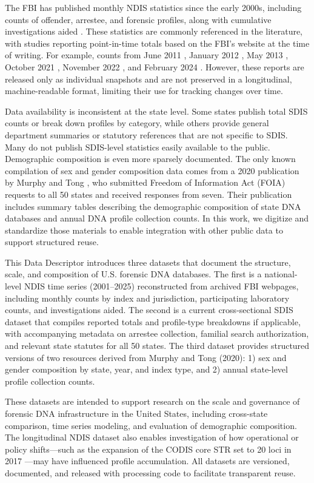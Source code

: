 \documentclass{article}
\begin{document}
The FBI has published monthly NDIS statistics since the early 2000s, including counts of offender, arrestee, and forensic profiles, along with cumulative investigations aided \cite{Unknown2022-qe}. These statistics are commonly referenced in the literature, with studies reporting point-in-time totals based on the FBI's website at the time of writing. For example, counts from June 2011 \cite{Ge2012-if}, January 2012 \cite{Ge2012-ve}, May 2013 \cite{Ge2014-rl}, October 2021 \cite{Wickenheiser2022-tb}, November 2022 \cite{Link2023-dm}, and February 2024 \cite{Greenwald2024-sg}. However, these reports are released only as individual snapshots and are not preserved in a longitudinal, machine-readable format, limiting their use for tracking changes over time.

Data availability is inconsistent at the state level. Some states publish total SDIS counts or break down profiles by category, while others provide general department summaries or statutory references that are not specific to SDIS. Many do not publish SDIS-level statistics easily available to the public. Demographic composition is even more sparsely documented. The only known compilation of sex and gender composition data comes from a 2020 publication by Murphy and Tong \cite{Murphy2020-pc}, who submitted Freedom of Information Act (FOIA) requests to all 50 states and received responses from seven. Their publication includes summary tables describing the demographic composition of state DNA databases and annual DNA profile collection counts. In this work, we digitize and standardize those materials to enable integration with other public data to support structured reuse.

This Data Descriptor introduces three datasets that document the structure, scale, and composition of U.S. forensic DNA databases. The first is a national-level NDIS time series (2001--2025) reconstructed from archived FBI webpages, including monthly counts by index and jurisdiction, participating laboratory counts, and investigations aided. The second is a current cross-sectional SDIS dataset that compiles reported totals and profile-type breakdowns if applicable, with accompanying metadata on arrestee collection, familial search authorization, and relevant state statutes for all 50 states. The third dataset provides structured versions of two resources derived from Murphy and Tong (2020): 1) sex and gender composition by state, year, and index type, and 2) annual state-level profile collection counts.

These datasets are intended to support research on the scale and governance of forensic DNA infrastructure in the United States, including cross-state comparison, time series modeling, and evaluation of demographic composition. The longitudinal NDIS dataset also enables investigation of how operational or policy shifts---such as the expansion of the CODIS core STR set to 20 loci in 2017 \cite{Hares2015-ep}---may have influenced profile accumulation. All datasets are versioned, documented, and released with processing code to facilitate transparent reuse.
\end{document}
